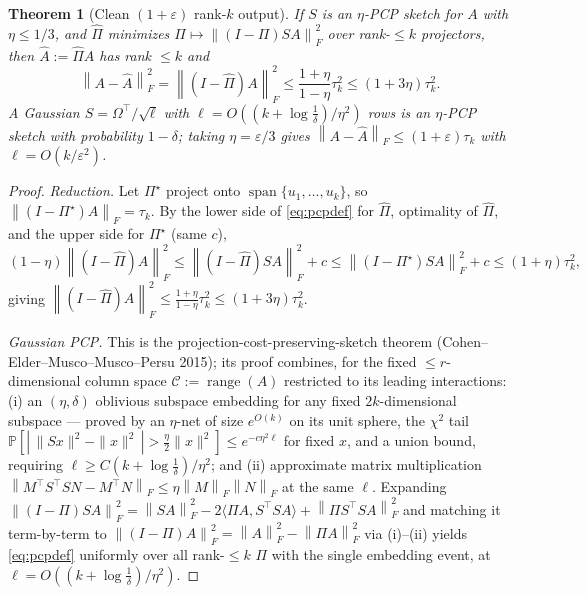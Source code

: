 \documentclass{amsart}
\newtheorem{theorem}{Theorem}
\theoremstyle{definition}
\DeclareMathOperator{\range}{range}
\DeclareMathOperator{\spann}{span}
\newcommand{\Frob}[1]{\left\lVert #1\right\rVert_F}
\newcommand{\Prob}{\mathbb{P}}
\begin{document}
\begin{theorem}[Clean $(1+\varepsilon)$ rank-$k$ output]\label{thm:pcp}
If $S$ is an $\eta$-PCP sketch for $A$ with $\eta\le1/3$, and $\widehat\Pi$
minimizes $\Pi\mapsto\Frob{(I-\Pi)SA}^2$ over rank-$\le k$ projectors, then
$\widehat A:=\widehat\Pi A$ has rank $\le k$ and
\begin{equation}\label{eq:pcpbound}
\Frob{A-\widehat A}^2=\Frob{(I-\widehat\Pi)A}^2
\le\frac{1+\eta}{1-\eta}\tau_k^2\le(1+3\eta)\tau_k^2 .
\end{equation}
A Gaussian $S=\Omega^\top/\sqrt\ell$ with $\ell=O((k+\log\tfrac1\delta)/\eta^2)$
rows is an $\eta$-PCP sketch with probability $1-\delta$; taking $\eta=\varepsilon/3$
gives $\Frob{A-\widehat A}\le(1+\varepsilon)\tau_k$ with $\ell=O(k/\varepsilon^2)$.
\end{theorem}

\begin{proof}
\emph{Reduction.} Let $\Pi^\star$ project onto $\spann\{u_1,\dots,u_k\}$, so
$\Frob{(I-\Pi^\star)A}=\tau_k$. By the lower side of \eqref{eq:pcpdef} for
$\widehat\Pi$, optimality of $\widehat\Pi$, and the upper side for $\Pi^\star$
(same $c$),
\[
(1-\eta)\Frob{(I-\widehat\Pi)A}^2\le\Frob{(I-\widehat\Pi)SA}^2+c
\le\Frob{(I-\Pi^\star)SA}^2+c\le(1+\eta)\tau_k^2 ,
\]
giving $\Frob{(I-\widehat\Pi)A}^2\le\frac{1+\eta}{1-\eta}\tau_k^2\le(1+3\eta)\tau_k^2$.

\emph{Gaussian PCP.} This is the projection-cost-preserving-sketch theorem
(Cohen--Elder--Musco--Musco--Persu 2015); its proof combines, for the fixed
$\le r$-dimensional column space $\mathcal C:=\range(A)$ restricted to its
leading interactions: (i) an $(\eta,\delta)$ oblivious subspace embedding for any
fixed $2k$-dimensional subspace --- proved by an $\eta$-net of size $e^{O(k)}$ on
its unit sphere, the $\chi^2$ tail
$\Prob[|\,\|Sx\|^2-\|x\|^2\,|>\tfrac\eta2\|x\|^2]\le e^{-c\eta^2\ell}$ for fixed
$x$, and a union bound, requiring $\ell\ge C(k+\log\tfrac1\delta)/\eta^2$; and
(ii) approximate matrix multiplication
$\Frob{M^\top S^\top SN-M^\top N}\le\eta\Frob M\Frob N$ at the same $\ell$.
Expanding $\Frob{(I-\Pi)SA}^2=\Frob{SA}^2-2\langle\Pi A,S^\top SA\rangle
+\Frob{\Pi S^\top SA}^2$ and matching it term-by-term to
$\Frob{(I-\Pi)A}^2=\Frob A^2-\Frob{\Pi A}^2$ via (i)--(ii) yields
\eqref{eq:pcpdef} uniformly over all rank-$\le k$ $\Pi$ with the single
embedding event, at $\ell=O((k+\log\tfrac1\delta)/\eta^2)$.
\end{proof}
\end{document}
